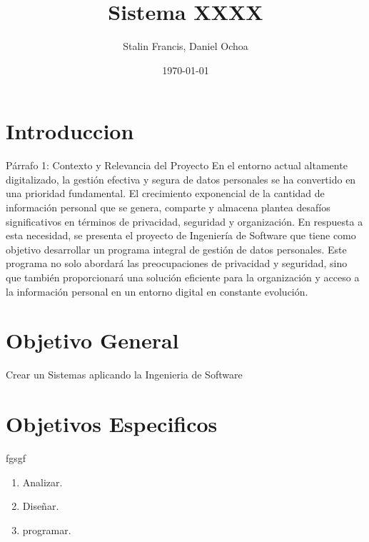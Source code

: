 \documentclass[11pt]{article}
\title{ Sistema XXXX}
\author{ Stalin Francis, Daniel Ochoa }
\date{\today}
\begin{document}
\maketitle	
\section{Introduccion}

Párrafo 1: Contexto y Relevancia del Proyecto
En el entorno actual altamente digitalizado, la gestión efectiva y segura de datos personales se ha convertido en una prioridad fundamental. El crecimiento exponencial de la cantidad de información personal que se genera, comparte y almacena plantea desafíos significativos en términos de privacidad, seguridad y organización. En respuesta a esta necesidad, se presenta el proyecto de Ingeniería de Software que tiene como objetivo desarrollar un programa integral de gestión de datos personales. Este programa no solo abordará las preocupaciones de privacidad y seguridad, sino que también proporcionará una solución eficiente para la organización y acceso a la información personal en un entorno digital en constante evolución.
\section{Objetivo General}
Crear un Sistemas aplicando la Ingenieria de Software

\section{Objetivos Especificos}
fgsgf
\begin{enumerate}
\item Analizar.
\item Diseñar.
\item programar.

\end{enumerate}
\end{document}
